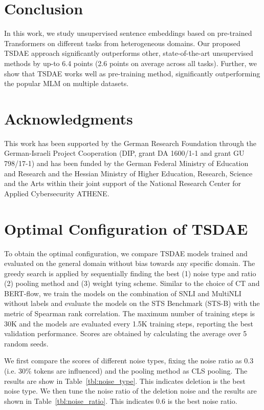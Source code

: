\documentclass[11pt,a4paper]{article}
\begin{document}
\section{Conclusion}
In this work, we study unsupervised sentence embeddings based on pre-trained Transformers on different tasks from heterogeneous domains. Our proposed TSDAE approach significantly outperforms other, state-of-the-art unsupervised methods by up-to 6.4 points (2.6 points on average across all tasks). Further, we show that TSDAE works well as pre-training method, significantly outperforming the popular MLM on multiple datasets.





\section*{Acknowledgments}
This work has been supported by the German Research Foundation through the German-Israeli Project Cooperation (DIP, grant DA 1600/1-1 and grant GU 798/17-1) and has been funded by the  German Federal Ministry of Education and Research and the Hessian Ministry of Higher Education, Research, Science and the Arts within their joint support of the National Research Center for Applied Cybersecurity ATHENE.






\onecolumn
\appendix

\section{Optimal Configuration of TSDAE}
\label{sec:TSDAE_config}
To obtain the optimal configuration, we compare TSDAE models trained and evaluated on the general domain without bias towards any specific domain. The greedy search is applied by sequentially finding the best (1) noise type and ratio (2) pooling method and (3) weight tying scheme. Similar to the choice of CT and BERT-flow, we train the models on the combination of SNLI and MultiNLI without labels and evaluate the models on the STS Benchmark (STS-B) with the metric of Spearman rank correlation. The maximum number of training steps is 30K and the models are evaluated every 1.5K training steps, reporting the best validation performance. Scores are obtained by calculating the average over 5 random seeds.

We first compare the scores of different noise types, fixing the noise ratio as 0.3 (i.e. 30\% tokens are influenced) and the pooling method as CLS pooling. The results are show in Table~\ref{tbl:noise_type}. This indicates deletion is the best noise type. We then tune the noise ratio of the deletion noise and the results are shown in Table~\ref{tbl:noise_ratio}. This indicates 0.6 is the best noise ratio. 
\end{document}
